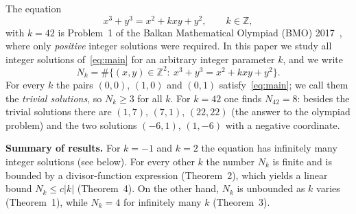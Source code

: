 The equation
\begin{equation}\label{eq:main}
x^3+y^3=x^2+kxy+y^2,\qquad k\in\mathbb Z,
\end{equation}
with $k=42$ is Problem~1 of the Balkan Mathematical Olympiad (BMO) 2017~\cite{bmo}, where only \emph{positive} integer solutions were required. In this paper we study all integer solutions of~\eqref{eq:main} for an arbitrary integer parameter $k$, and we write
\[
N_k=\#\{(x,y)\in\mathbb Z^2:\ x^3+y^3=x^2+kxy+y^2\}.
\]
For every $k$ the pairs $(0,0)$, $(1,0)$ and $(0,1)$ satisfy~\eqref{eq:main}; we call them the \emph{trivial solutions}, so $N_k\ge 3$ for all $k$. For $k=42$ one finds $N_{42}=8$: besides the trivial solutions there are $(1,7)$, $(7,1)$, $(22,22)$ (the answer to the olympiad problem) and the two solutions $(-6,1)$, $(1,-6)$ with a negative coordinate.

\medskip
\noindent\textbf{Summary of results.} For $k=-1$ and $k=2$ the equation has infinitely many integer solutions (see below). For every other $k$ the number $N_k$ is finite and is bounded by a divisor-function expression (Theorem~2), which yields a linear bound $N_k\le c|k|$ (Theorem~4). On the other hand, $N_k$ is unbounded as $k$ varies (Theorem~1), while $N_k=4$ for infinitely many $k$ (Theorem~3).


